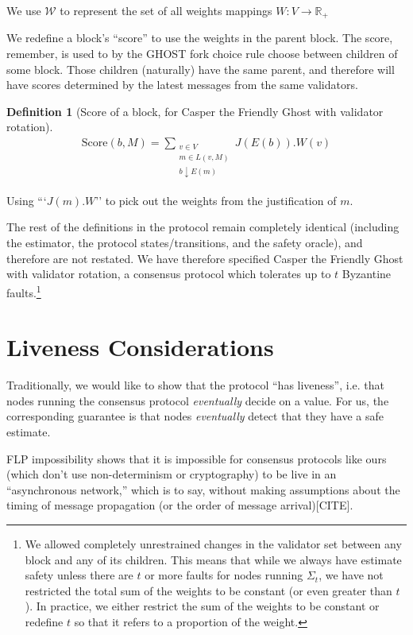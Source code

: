 \documentclass{article}
\theoremstyle{definition}
\newtheorem{defn}{Definition}[section]
\begin{document}
We use $\mathcal{W}$ to represent the set of all weights mappings $W:V \to \mathbb{R}_+$

We redefine a block's ``score'' to use the weights in the parent block. The score, remember, is used to by the GHOST fork choice rule choose between children of some block. Those children (naturally) have the same parent, and therefore will have scores determined by the latest messages from the same validators.

\begin{defn}[Score of a block, for Casper the Friendly Ghost with validator rotation]
\begin{align}
\text{Score}(b, M) = \sum_{\substack{v \in V \\ m \in L(v,M) \\ b \downarrow E(m)}} J(E(b)).W(v)
\end{align}
\end{defn}

Using ```$J(m).W$'' to pick out the weights from the justification of $m$.

The rest of the definitions in the protocol remain completely identical (including the estimator, the protocol states/transitions, and the safety oracle), and therefore are not restated. We have therefore specified Casper the Friendly Ghost with validator rotation, a consensus protocol which tolerates up to $t$ Byzantine faults.\footnote{We allowed completely unrestrained changes in the validator set between any block and any of its children. This means that while we always have estimate safety unless there are $t$ or more faults for nodes running $\Sigma_t$, we have not restricted the total sum of the weights to be constant (or even greater than $t$). In practice, we either restrict the sum of the weights to be constant or redefine $t$ so that it refers to a proportion of the weight.}


\section{Liveness Considerations}

Traditionally, we would like to show that the protocol ``has liveness'', i.e. that nodes running the consensus protocol \emph{eventually} decide on a value. For us, the corresponding guarantee is that nodes \emph{eventually} detect that they have a safe estimate.

FLP impossibility shows that it is impossible for consensus protocols like ours (which don't use non-determinism or cryptography) to be live in an ``asynchronous network,'' which is to say, without making assumptions about the timing of message propagation (or the order of message arrival)[CITE].
\end{document}
